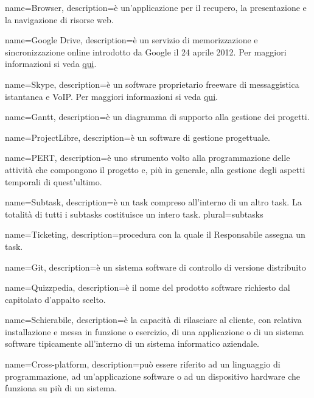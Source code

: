  {
	name=Browser,
	description={è un'applicazione per il recupero, la presentazione e la navigazione di risorse web.}
}

 {
	name=Google Drive,
	description={è un servizio di memorizzazione e sincronizzazione online introdotto da Google il 24 aprile 2012. Per maggiori informazioni si veda \href{https://it.wikipedia.org/wiki/Google_Drive}{qui}.}
}

 {
	name=Skype,
	description={è un software proprietario freeware di messaggistica istantanea e VoIP. Per maggiori informazioni si veda \href{https://it.wikipedia.org/wiki/Skype}{qui}.}
}

 {
	name=Gantt,
	description={è un diagramma di supporto alla gestione dei progetti.}
}

 {
	name=ProjectLibre,
	description={è un software di gestione progettuale.}
}

 {
	name=PERT,
	description={è uno strumento volto alla programmazione delle attività che compongono il progetto e, più in generale, alla gestione degli aspetti temporali di quest'ultimo.}
}

 {
	name=Subtask,
	description={è un task compreso all'interno di un altro task. La totalità di tutti i subtasks costituisce un intero task.}
	plural=subtasks
}

 {
	name=Ticketing,
	description={procedura con la quale il Responsabile assegna un task.}
}

 {
	name=Git,
	description={è un sistema software di controllo di versione distribuito}
}

 {
	name=Quizzpedia,
	description={è il nome del prodotto software richiesto dal capitolato d'appalto scelto.}
}

 {
	name=Schierabile,
	description={è la capacità di rilasciare al cliente, con relativa installazione e messa in funzione o esercizio, di una applicazione o di un sistema software tipicamente all'interno di un sistema informatico aziendale.}
}

 {
	name=Cross-platform,
	description={può essere riferito ad un linguaggio di programmazione, ad un'applicazione software o ad un dispositivo hardware che funziona su più di un sistema.}
}

